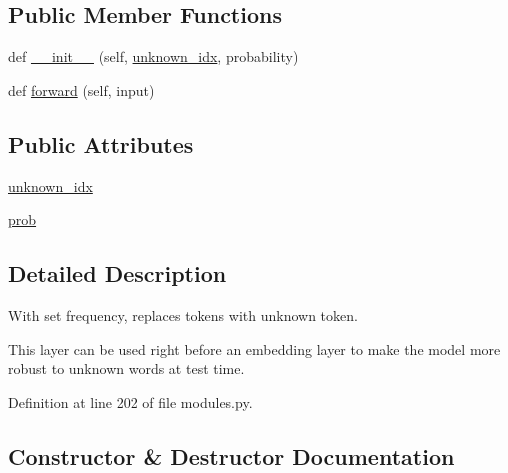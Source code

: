 \subsection*{Public Member Functions}
\begin{DoxyCompactItemize}
\item 
def \hyperlink{classparlai_1_1agents_1_1seq2seq_1_1modules_1_1UnknownDropout_a5952043e80e40861ae67ca548b6e4c23}{\+\_\+\+\_\+init\+\_\+\+\_\+} (self, \hyperlink{classparlai_1_1agents_1_1seq2seq_1_1modules_1_1UnknownDropout_aff31c992c18277c85619d257401c621a}{unknown\+\_\+idx}, probability)
\item 
def \hyperlink{classparlai_1_1agents_1_1seq2seq_1_1modules_1_1UnknownDropout_ae0771638ed591c911178d94cd2bdc59d}{forward} (self, input)
\end{DoxyCompactItemize}
\subsection*{Public Attributes}
\begin{DoxyCompactItemize}
\item 
\hyperlink{classparlai_1_1agents_1_1seq2seq_1_1modules_1_1UnknownDropout_aff31c992c18277c85619d257401c621a}{unknown\+\_\+idx}
\item 
\hyperlink{classparlai_1_1agents_1_1seq2seq_1_1modules_1_1UnknownDropout_a1a265182c039545be63eb24c57bf3251}{prob}
\end{DoxyCompactItemize}


\subsection{Detailed Description}
\begin{DoxyVerb}With set frequency, replaces tokens with unknown token.

This layer can be used right before an embedding layer to make the model more robust
to unknown words at test time.
\end{DoxyVerb}
 

Definition at line 202 of file modules.\+py.



\subsection{Constructor \& Destructor Documentation}
\mbox{\label{classparlai_1_1agents_1_1seq2seq_1_1modules_1_1UnknownDropout_a5952043e80e40861ae67ca548b6e4c23}} 
